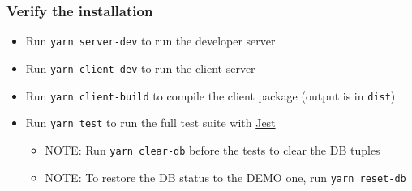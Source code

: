 \documentclass[
]{article}
\providecommand{\tightlist}{%
  \setlength{\itemsep}{0pt}\setlength{\parskip}{0pt}}
\begin{document}
\hypertarget{verify-the-installation}{%
\subsubsection{Verify the installation}\label{verify-the-installation}}

\begin{itemize}
\tightlist
\item
  Run \texttt{yarn\ server-dev} to run the developer server
\item
  Run \texttt{yarn\ client-dev} to run the client server
\item
  Run \texttt{yarn\ client-build} to compile the client package (output
  is in \texttt{dist})
\item
  Run \texttt{yarn\ test} to run the full test suite with
  \href{https://jestjs.io}{Jest}
  \begin{itemize}
    \item   NOTE: Run \texttt{yarn\ clear-db} before the tests to clear the DB tuples
    \item   NOTE: To restore the DB status to the DEMO one, run \texttt{yarn\ reset-db}
  \end{itemize}
\end{itemize}
\end{document}
